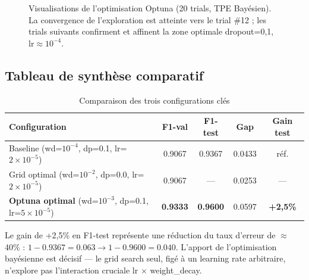 \documentclass[12pt,a4paper]{article}
\newcommand{\best}[1]{\textcolor{bestgreen}{\textbf{#1}}}
\begin{document}
\begin{figure}[H]
  \centering
  \caption{Visualisations de l'optimisation Optuna (20 trials, TPE Bayésien).
    La convergence de l'exploration est atteinte vers le trial \#12 ; les trials
    suivants confirment et affinent la zone optimale dropout=0,1, lr$\approx 10^{-4}$.}
  \label{fig:optuna_convergence}
\end{figure}

\subsection{Tableau de synthèse comparatif}
\label{ssec:synthese_optim}

\begin{table}[H]
  \centering
  \caption{Comparaison des trois configurations clés}
  \label{tab:synthese}
  \begin{tabularx}{\textwidth}{Xcccc}
    \toprule
    \textbf{Configuration} & \textbf{F1-val} & \textbf{F1-test}
    & \textbf{Gap} & \textbf{Gain test} \\
    \midrule
    Baseline (wd=$10^{-4}$, dp=0.1, lr=$2\times10^{-5}$)
      & 0.9067 & 0.9367 & 0.0433 & réf. \\
    Grid optimal (wd=$10^{-2}$, dp=0.0, lr=$2\times10^{-5}$)
      & 0.9067 & —      & 0.0253 & — \\
    \rowcolor{bestgreen!15}
    \textbf{Optuna optimal} (wd=$10^{-3}$, dp=0.1, lr=$5\times10^{-5}$)
      & \best{0.9333} & \best{0.9600} & 0.0597 & \best{+2,5\%} \\
    \bottomrule
  \end{tabularx}
\end{table}

Le gain de +2,5\% en F1-test représente une réduction du taux d'erreur de
$\approx$40\% : $1 - 0.9367 = 0.063 \rightarrow 1 - 0.9600 = 0.040$.
L'apport de l'optimisation bayésienne est décisif — le grid search seul,
figé à un learning rate arbitraire, n'explore pas l'interaction cruciale
lr × weight\_decay.
\end{document}
